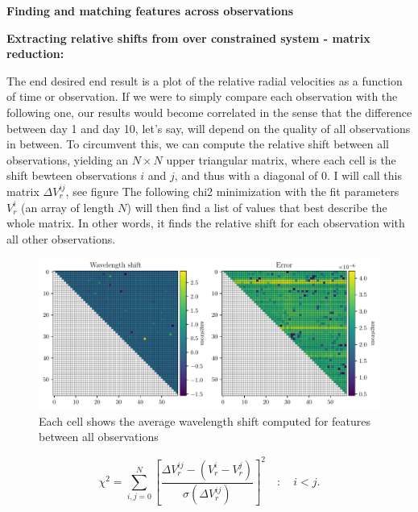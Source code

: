     \bigbreak
    \noindent\textbf{Finding and matching features across observations}
    
    \todo{}

    \bigbreak
    \noindent\textbf{Extracting relative shifts from over constrained system - matrix reduction:}
    
    The end desired end result is a plot of the relative radial velocities as a function of time or observation. If we were to simply compare each observation with the following one, our results would become correlated in the sense that the difference between day 1 and day 10, let's say, will depend on the quality of all observations in between. To circumvent this, we can compute the relative shift between all observations, yielding an $N\times N$ upper triangular matrix, where each cell is the shift bewteen observations $i$ and $j$, and thus with a diagonal of 0. I will call this matrix $\Delta V_r^{ij}$, see figure \todo{} The following chi2 minimization with the fit parameters $V_r^i$ (an array of length $N$) will then find a list of values that best describe the whole matrix. In other words, it finds the relative shift for each observation with all other observations. 
    
    \begin{figure}[ht]
        \centering
        \includegraphics[scale=0.8]{figures/all_features_34411_angstrom_matrix.pdf}
        \caption{Each cell shows the average wavelength shift computed for features between all observations}
        \label{fig:shift_matrix}
    \end{figure}

    \begin{equation}
        \label{eq:matrix_reduction_fit}
        \chi^{2}=\sum_{i,j = 0}^{N}\left[\frac{ \Delta V_{r}^{ij} - (V_r^i - V_r^j) }{\sigma(\Delta V_{r}^{ij})}\right]^{2} \quad : \quad i < j.
    \end{equation}
    
